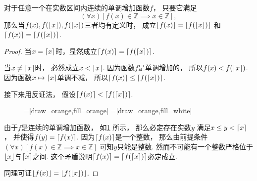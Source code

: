 \begin{example}\label{example:取整函数.单调增加函数与取整函数的复合}
对于任意一个在实数区间内连续的单调增加函数\(f\)，
只要它满足\begin{equation*}
	(\forall x)[f(x) \in \mathbb{Z} \implies x \in \mathbb{Z}],
\end{equation*}
那么当\(f(x),f(\lfloor x\rfloor),f(\lceil x\rceil)\)三者均有定义时，
成立\(\lfloor f(x)\rfloor = \lfloor f(\lfloor x\rfloor)\rfloor\)
和\(\lceil f(x)\rceil = \lceil f(\lceil x\rceil)\rceil\).
\begin{proof}
当\(x = \lceil x\rceil\)时，显然成立\(\lceil f(x)\rceil = \lceil f(\lceil x\rceil)\rceil\).

当\(x \neq \lceil x\rceil\)时，
必然成立\(x < \lceil x\rceil\).
因为函数\(f\)是单调增加的，
所以\(f(x) < f(\lceil x\rceil)\).
因为函数\(x \mapsto \lceil x\rceil\)单调不减，
所以\(\lceil f(x)\rceil \leq \lceil f(\lceil x\rceil)\rceil\).

接下来用反证法，
假设\(\lceil f(x)\rceil < \lceil f(\lceil x\rceil)\rceil\).
\begin{figure}
	=[draw=orange,fill=orange]
	=[draw=orange,fill=white]
	\centering
	\caption{}
	\label{figure-example:取整函数.单调增加函数与取整函数的复合}
\end{figure}
由于\(f\)是连续的单调增加函数，
如\cref{figure-example:取整函数.单调增加函数与取整函数的复合} 所示，
那么必定存在实数\(y\)
满足\(x \leq y < \lceil x\rceil\)，
并使得\(f(y) = \lceil f(x)\rceil\).
因为\(\lceil f(x)\rceil\)是一个整数，
那么由前提条件\((\forall x)[f(x) \in \mathbb{Z} \implies x \in \mathbb{Z}]\)
可知\(y\)只能是整数.
然而不可能有一个整数严格位于\(\lfloor x\rfloor\)与\(\lceil x\rceil\)之间.
这个矛盾说明\(\lceil f(x)\rceil = \lceil f(\lceil x\rceil)\rceil\)必定成立.

同理可证\(\lfloor f(x)\rfloor = \lfloor f(\lfloor x\rfloor)\rfloor\).
\end{proof}
\end{example}
